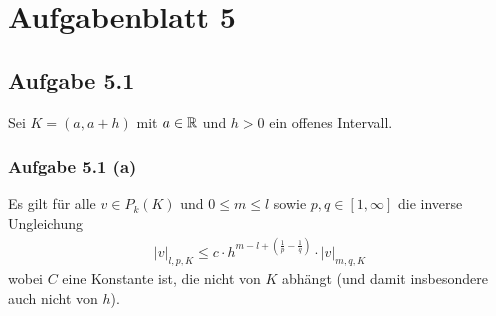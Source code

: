 
\section{Aufgabenblatt 5}
\subsection{Aufgabe 5.1}
Sei $K=(a,a+h)$ mit $a\in\mathbb{R}$ und $h>0$ ein offenes Intervall.

\subsubsection{Aufgabe 5.1 (a)}
Es gilt für alle $v\in P_k(K)$ und $0\leq m\leq l$ sowie $p,q\in[1,\infty]$ die inverse Ungleichung
\begin{align*}
	|v|_{l,p,K}\leq c\cdot h^{m-l+\left(\frac{1}{p}-\frac{1}{q}\right)}\cdot|v|_{m,q,K}
\end{align*}
wobei $C$ eine Konstante ist, die nicht von $K$ abhängt (und damit insbesondere auch nicht von $h$).


